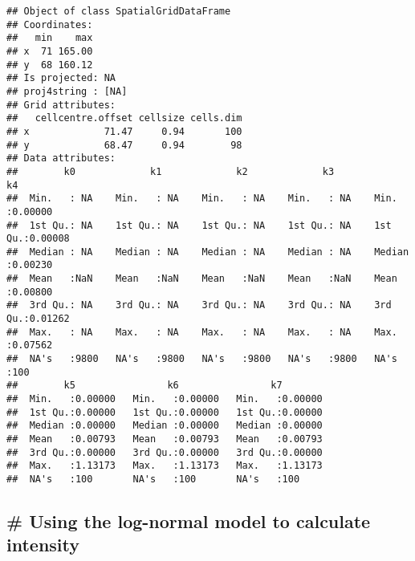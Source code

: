 \documentclass[]{article}
\begin{document}
\begin{verbatim}
## Object of class SpatialGridDataFrame
## Coordinates:
##   min    max
## x  71 165.00
## y  68 160.12
## Is projected: NA 
## proj4string : [NA]
## Grid attributes:
##   cellcentre.offset cellsize cells.dim
## x             71.47     0.94       100
## y             68.47     0.94        98
## Data attributes:
##        k0             k1             k2             k3             k4         
##  Min.   : NA    Min.   : NA    Min.   : NA    Min.   : NA    Min.   :0.00000  
##  1st Qu.: NA    1st Qu.: NA    1st Qu.: NA    1st Qu.: NA    1st Qu.:0.00008  
##  Median : NA    Median : NA    Median : NA    Median : NA    Median :0.00230  
##  Mean   :NaN    Mean   :NaN    Mean   :NaN    Mean   :NaN    Mean   :0.00800  
##  3rd Qu.: NA    3rd Qu.: NA    3rd Qu.: NA    3rd Qu.: NA    3rd Qu.:0.01262  
##  Max.   : NA    Max.   : NA    Max.   : NA    Max.   : NA    Max.   :0.07562  
##  NA's   :9800   NA's   :9800   NA's   :9800   NA's   :9800   NA's   :100      
##        k5                k6                k7         
##  Min.   :0.00000   Min.   :0.00000   Min.   :0.00000  
##  1st Qu.:0.00000   1st Qu.:0.00000   1st Qu.:0.00000  
##  Median :0.00000   Median :0.00000   Median :0.00000  
##  Mean   :0.00793   Mean   :0.00793   Mean   :0.00793  
##  3rd Qu.:0.00000   3rd Qu.:0.00000   3rd Qu.:0.00000  
##  Max.   :1.13173   Max.   :1.13173   Max.   :1.13173  
##  NA's   :100       NA's   :100       NA's   :100
\end{verbatim}

\hypertarget{using-the-log-normal-model-to-calculate-intensity}{%
\subsection{\# Using the log-normal model to calculate
intensity}\label{using-the-log-normal-model-to-calculate-intensity}}
\end{document}
